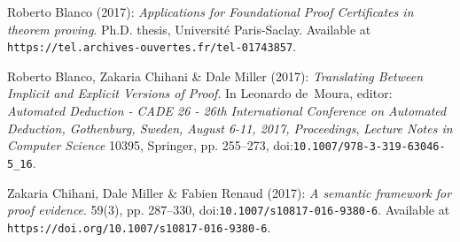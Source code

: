 \documentclass[submission,copyright,creativecommons]{eptcs}
\begin{document}

%
\begin{thebibliography}{10}
\providecommand{\bibitemdeclare}[2]{}
\providecommand{\surnamestart}{}
\providecommand{\surnameend}{}
\providecommand{\urlprefix}{Available at }
\providecommand{\url}[1]{\texttt{#1}}
\providecommand{\href}[2]{\texttt{#2}}
\providecommand{\urlalt}[2]{\href{#1}{#2}}
\providecommand{\doi}[1]{doi:\urlalt{http://dx.doi.org/#1}{#1}}
\providecommand{\bibinfo}[2]{#2}

\bibitemdeclare{phdthesis}{blanco17phd}
\bibinfo{author}{Roberto \surnamestart Blanco\surnameend}
  (\bibinfo{year}{2017}): \emph{\bibinfo{title}{Applications for Foundational
  Proof Certificates in theorem proving}}.
\newblock Ph.D. thesis, \bibinfo{school}{Universit{\'e} Paris-Saclay}.
\newblock \urlprefix\url{https://tel.archives-ouvertes.fr/tel-01743857}.

\bibitemdeclare{inproceedings}{blanco17cade}
\bibinfo{author}{Roberto \surnamestart Blanco\surnameend},
  \bibinfo{author}{Zakaria \surnamestart Chihani\surnameend} \&
  \bibinfo{author}{Dale \surnamestart Miller\surnameend}
  (\bibinfo{year}{2017}): \emph{\bibinfo{title}{Translating Between Implicit
  and Explicit Versions of Proof}}.
\newblock In \bibinfo{editor}{Leonardo \surnamestart de~Moura\surnameend},
  editor: {\sl \bibinfo{booktitle}{Automated Deduction - {CADE} 26 - 26th
  International Conference on Automated Deduction, Gothenburg, Sweden, August
  6-11, 2017, Proceedings}}, {\sl \bibinfo{series}{Lecture Notes in Computer
  Science}} \bibinfo{volume}{10395}, \bibinfo{publisher}{Springer}, pp.
  \bibinfo{pages}{255--273}, \doi{10.1007/978-3-319-63046-5\_16}.

\bibitemdeclare{article}{chihani17jar}
\bibinfo{author}{Zakaria \surnamestart Chihani\surnameend},
  \bibinfo{author}{Dale \surnamestart Miller\surnameend} \&
  \bibinfo{author}{Fabien \surnamestart Renaud\surnameend}
  (\bibinfo{year}{2017}): \emph{\bibinfo{title}{A semantic framework for proof
  evidence}}.
\newblock {\sl \bibinfo{journal}{J. of Automated Reasoning}}
  \bibinfo{volume}{59}(\bibinfo{number}{3}), pp. \bibinfo{pages}{287--330},
  \doi{10.1007/s10817-016-9380-6}.
\newblock \urlprefix\url{https://doi.org/10.1007/s10817-016-9380-6}.


\end{thebibliography}
\end{document}
